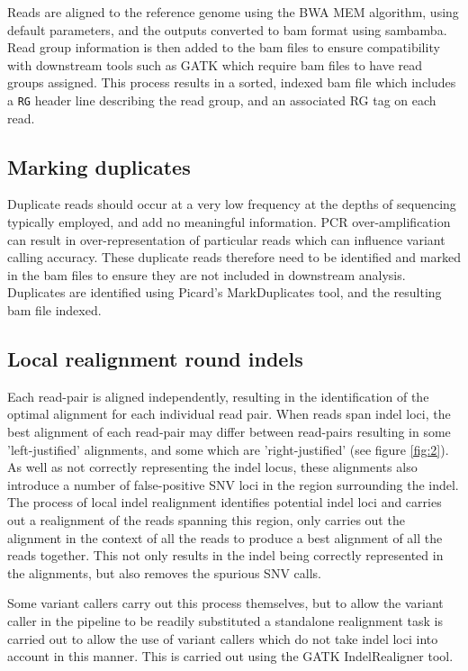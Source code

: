 \documentclass[a4paper,10pt,twoside]{article}
\begin{document}
Reads are aligned to the reference genome using the BWA MEM algorithm, using
default parameters, and the outputs converted to bam format using sambamba.
Read group information is then added to the bam files to ensure compatibility
with downstream tools such as GATK which require bam files to have read groups
assigned. This process results in a sorted, indexed bam file which includes a
{\tt RG} header line describing the read group, and an associated RG tag on
each read.

\subsection{Marking duplicates}

Duplicate reads should occur at a very low frequency at the depths of
sequencing typically employed, and add no meaningful information. PCR
over-amplification can result in over-representation of particular reads which
can influence variant calling accuracy. These duplicate reads therefore need to
be identified and marked in the bam files to ensure they are not included in
downstream analysis.  Duplicates are identified using Picard's MarkDuplicates
tool, and the resulting bam file indexed.

\subsection{Local realignment round indels}

Each read-pair is aligned independently, resulting in the identification of the
optimal alignment for each individual read pair. When reads span indel loci,
the best alignment of each read-pair may differ between read-pairs resulting in
some 'left-justified' alignments, and some which are 'right-justified' (see
figure \ref{fig:2}). As well as not correctly representing the indel locus,
these alignments also introduce a number of false-positive SNV loci in the
region surrounding the indel. The process of local indel realignment identifies
potential indel loci and carries out a realignment of the reads spanning this
region, only carries out the alignment in the context of all the reads to
produce a best alignment of all the reads together. This not only results in
the indel being correctly represented in the alignments, but also removes the
spurious SNV calls.

Some variant callers carry out this process themselves, but to allow the
variant caller in the pipeline to be readily substituted a standalone
realignment task is carried out to allow the use of variant callers which do
not take indel loci into account in this manner.  This is carried out using the
GATK IndelRealigner tool. 
\end{document}
